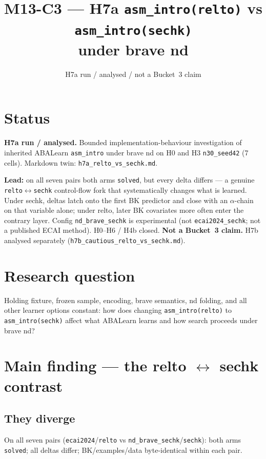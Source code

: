 \documentclass[11pt]{article}
\title{M13-C3 --- H7a \texttt{asm\_intro(relto)} vs \texttt{asm\_intro(sechk)}\\
under brave nd}
\author{}
\date{H7a run / analysed / not a Bucket~3 claim}
\begin{document}
\maketitle

\section{Status}

\textbf{H7a run / analysed.}
Bounded implementation-behaviour investigation of inherited ABALearn
\texttt{asm\_intro} under brave nd on H0 and H3 \texttt{n30\_seed42}
(7 cells).
Markdown twin: \texttt{h7a\_relto\_vs\_sechk.md}.

\textbf{Lead:} on all seven pairs both arms \texttt{solved}, but every delta
differs --- a genuine \texttt{relto}$\leftrightarrow$\texttt{sechk} control-flow
fork that systematically changes what is learned.
Under sechk, deltas latch onto the first BK predictor and close with an
$\alpha$-chain on that variable alone; under relto, later BK covariates more
often enter the contrary layer.
Config \texttt{nd\_brave\_sechk} is experimental (not \texttt{ecai2024\_sechk};
not a published ECAI method).
H0--H6 / H4b closed.
\textbf{Not a Bucket~3 claim.}
H7b analysed separately (\texttt{h7b\_cautious\_relto\_vs\_sechk.md}).

\section{Research question}

Holding fixture, frozen sample, encoding, brave semantics, nd folding, and all
other learner options constant: how does changing \texttt{asm\_intro(relto)} to
\texttt{asm\_intro(sechk)} affect what ABALearn learns and how search proceeds
under brave nd?

\section{Main finding --- the relto $\leftrightarrow$ sechk contrast}

\subsection{They diverge}

On all seven pairs (\texttt{ecai2024}/\texttt{relto} vs
\texttt{nd\_brave\_sechk}/\texttt{sechk}): both arms \texttt{solved}; all
deltas differ; BK/examples/data byte-identical within each pair.
\end{document}
